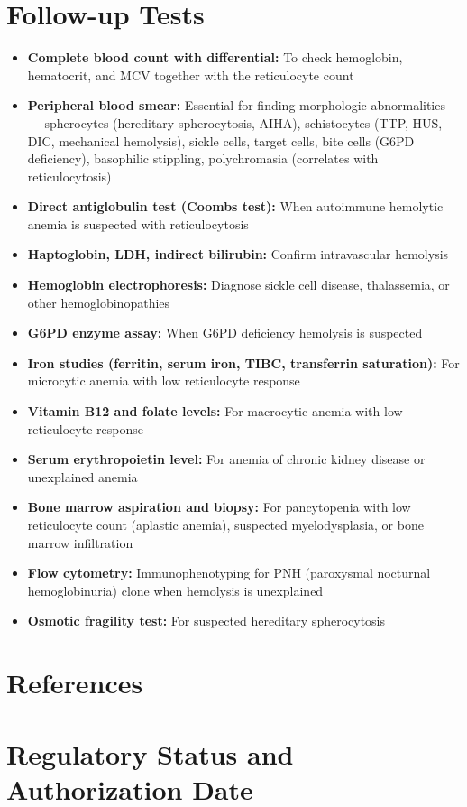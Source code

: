 \section*{Follow-up Tests}
\begin{itemize}
  \item \textbf{Complete blood count with differential:} To check hemoglobin, hematocrit, and MCV together with the reticulocyte count
  \item \textbf{Peripheral blood smear:} Essential for finding morphologic abnormalities --- spherocytes (hereditary spherocytosis, AIHA), schistocytes (TTP, HUS, DIC, mechanical hemolysis), sickle cells, target cells, bite cells (G6PD deficiency), basophilic stippling, polychromasia (correlates with reticulocytosis)
  \item \textbf{Direct antiglobulin test (Coombs test):} When autoimmune hemolytic anemia is suspected with reticulocytosis
  \item \textbf{Haptoglobin, LDH, indirect bilirubin:} Confirm intravascular hemolysis
  \item \textbf{Hemoglobin electrophoresis:} Diagnose sickle cell disease, thalassemia, or other hemoglobinopathies
  \item \textbf{G6PD enzyme assay:} When G6PD deficiency hemolysis is suspected
  \item \textbf{Iron studies (ferritin, serum iron, TIBC, transferrin saturation):} For microcytic anemia with low reticulocyte response
  \item \textbf{Vitamin B12 and folate levels:} For macrocytic anemia with low reticulocyte response
  \item \textbf{Serum erythropoietin level:} For anemia of chronic kidney disease or unexplained anemia
  \item \textbf{Bone marrow aspiration and biopsy:} For pancytopenia with low reticulocyte count (aplastic anemia), suspected myelodysplasia, or bone marrow infiltration
  \item \textbf{Flow cytometry:} Immunophenotyping for PNH (paroxysmal nocturnal hemoglobinuria) clone when hemolysis is unexplained
  \item \textbf{Osmotic fragility test:} For suspected hereditary spherocytosis
\end{itemize}

\section*{References}



\clearpage
\section*{Regulatory Status and Authorization Date}

\clearpage
